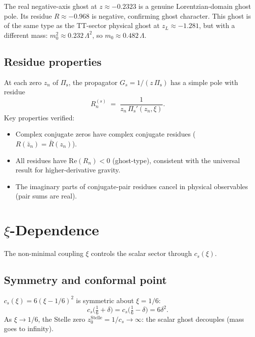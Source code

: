 \documentclass[11pt,a4paper]{article}
\newcommand{\Pis}{\Pi_{\mathrm{s}}}
\newcommand{\Real}{\mathrm{Re}}
\begin{document}
The real negative-axis ghost at $z \approx -0.2323$ is a genuine
Lorentzian-domain ghost pole.  Its residue $R \approx -0.968$ is negative,
confirming ghost character.  This ghost is of the same type as the
TT-sector physical ghost at $z_L \approx -1.281$, but with a different mass:
$m_0^2 \approx 0.232\,\Lambda^2$, so $m_0 \approx 0.482\,\Lambda$.

\subsection{Residue properties}

At each zero $z_n$ of $\Pis$, the propagator $G_s = 1/(z\,\Pis)$ has a
simple pole with residue
\begin{equation}
  R_n^{(s)} \;=\; \frac{1}{z_n\,\Pis'(z_n,\xi)}.
\end{equation}
Key properties verified:
\begin{itemize}
  \item Complex conjugate zeros have complex conjugate residues
    ($R(\bar{z}_n) = \bar{R}(z_n)$).
  \item All residues have $\Real(R_n) < 0$ (ghost-type), consistent with
    the universal result for higher-derivative gravity.
  \item The imaginary parts of conjugate-pair residues cancel in physical
    observables (pair sums are real).
\end{itemize}

\section{$\xi$-Dependence}
\label{sec:xi}

The non-minimal coupling $\xi$ controls the scalar sector through $c_s(\xi)$.

\subsection{Symmetry and conformal point}

$c_s(\xi) = 6(\xi - 1/6)^2$ is symmetric about $\xi = 1/6$:
\begin{equation}
  c_s\bigl(\tfrac{1}{6} + \delta\bigr)
    = c_s\bigl(\tfrac{1}{6} - \delta\bigr)
    = 6\delta^2.
\end{equation}
As $\xi \to 1/6$, the Stelle zero $z_0^{\mathrm{Stelle}} = 1/c_s \to \infty$:
the scalar ghost decouples (mass goes to infinity).
\end{document}
